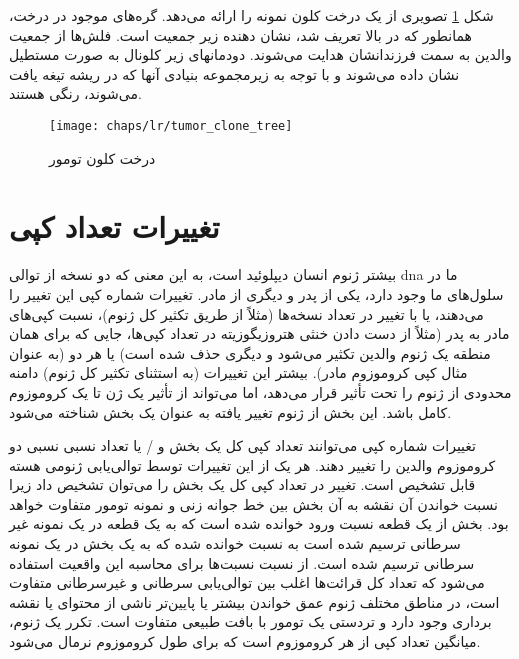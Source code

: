 شکل \ref{fig:ch_lr:tumor_clone_tree} تصویری از یک درخت کلون نمونه را ارائه می‌دهد. گره‌های موجود در درخت، همانطور که در بالا تعریف شد، نشان دهنده زیر جمعیت است. فلش‌ها از جمعیت والدین به سمت فرزندانشان هدایت می‌شوند. دودمانهای زیر کلونال به صورت مستطیل نشان داده می‌شوند و با توجه به زیرمجموعه بنیادی آنها که در ریشه تیغه یافت می‌شوند، رنگی هستند.


\begin{figure}[!ht]
	\centerline{\texttt{[image: chaps/lr/tumor\_clone\_tree]}}
	\caption{درخت کلون تومور}
	\label{fig:ch_lr:tumor_clone_tree}
\end{figure}




\section{تغییرات تعداد کپی}

بیشتر ژنوم انسان دیپلوئید است، به این معنی که دو نسخه از توالی \gls{dna} ما در سلول‌های ما وجود دارد، یکی از پدر و دیگری از مادر. تغییرات شماره کپی این تغییر را می‌دهند، یا با تغییر در تعداد نسخه‌ها (مثلاً از طریق تکثیر کل ژنوم)، نسبت کپی‌های مادر به پدر (مثلاً از دست دادن خنثی هتروزیگوزیته در تعداد کپی‌ها، جایی که برای همان منطقه یک ژنوم والدین تکثیر می‌شود و دیگری حذف شده است) یا هر دو (به عنوان مثال کپی کروموزوم مادر). بیشتر این تغییرات (به استثنای تکثیر کل ژنوم) دامنه محدودی از ژنوم را تحت تأثیر قرار می‌دهد، اما می‌تواند از تأثیر یک ژن تا یک کروموزوم کامل باشد. این بخش از ژنوم تغییر یافته به عنوان یک بخش شناخته می‌شود.


تغییرات شماره کپی می‌توانند تعداد کپی کل یک بخش و / یا تعداد نسبی نسبی دو کروموزوم والدین را تغییر دهند. هر یک از این تغییرات توسط توالی‌یابی ژنومی هسته قابل تشخیص است. تغییر در تعداد کپی کل یک بخش را می‌توان تشخیص داد زیرا نسبت خواندن آن نقشه به آن بخش بین خط جوانه زنی و نمونه تومور متفاوت خواهد بود. بخش از یک قطعه نسبت ورود خوانده شده است که به یک قطعه در یک نمونه غیر سرطانی ترسیم شده است به نسبت خوانده شده که به یک بخش در یک نمونه سرطانی ترسیم شده است. از نسبت نسبت‌ها برای محاسبه این واقعیت استفاده می‌شود که تعداد کل قرائت‌ها اغلب بین توالی‌یابی سرطانی و غیرسرطانی متفاوت است، در مناطق مختلف ژنوم عمق خواندن بیشتر یا پایین‌تر ناشی از محتوای  یا نقشه برداری وجود دارد و تردستی یک تومور با بافت طبیعی متفاوت است. تکرر یک ژنوم، میانگین تعداد کپی از هر کروموزوم است که برای طول کروموزوم نرمال می‌شود.



